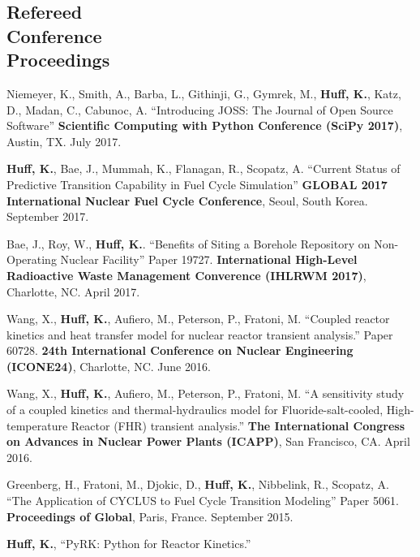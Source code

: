 \documentclass[margin,line]{resume}
\begin{document}
\begin{resume}
    \section{\mysidestyle Refereed\\Conference\\Proceedings}
    \begin{bibenum}
    \item Niemeyer, K., Smith, A., Barba, L., Githinji, G., Gymrek, M., 
            \textbf{Huff, K.}, Katz, D., Madan, C., Cabunoc, A. ``Introducing 
            JOSS: The Journal of Open Source Software'' \textbf{Scientific 
            Computing with Python Conference (SciPy 2017)}, Austin, TX. July 
            2017.
    \item \textbf{Huff, K.}, Bae, J., Mummah, K., Flanagan, R., Scopatz, A.
            ``Current Status of Predictive Transition Capability in Fuel Cycle 
            Simulation'' \textbf{GLOBAL 2017 International Nuclear Fuel Cycle 
            Conference}, Seoul, South Korea. September 2017.
      \item Bae, J., Roy, W., \textbf{Huff, K.}.
            ``Benefits of Siting a Borehole Repository on Non-Operating Nuclear 
            Facility'' Paper 19727.  \textbf{International High-Level Radioactive 
            Waste Management Converence (IHLRWM 2017)},
            Charlotte, NC. April 2017. 
      \item Wang, X., \textbf{Huff, K.}, Aufiero, M., Peterson, P., Fratoni, M.
            ``Coupled reactor kinetics and heat transfer model for nuclear 
            reactor transient analysis.'' Paper 60728.  \textbf{24th 
            International Conference on Nuclear Engineering (ICONE24)}, 
            Charlotte, NC.  June 2016. 
      \item Wang, X., \textbf{Huff, K.}, Aufiero, M., Peterson, P., Fratoni, M.
            ``A sensitivity study of a coupled kinetics and thermal-hydraulics 
            model for Fluoride-salt-cooled, High-temperature Reactor (FHR) 
            transient analysis.'' \textbf{The International 
            Congress on Advances in Nuclear Power Plants (ICAPP)}, San 
            Francisco, CA. April 2016.
      \item Greenberg, H., Fratoni, M., Djokic, D., \textbf{Huff, K.},
         Nibbelink, R., Scopatz, A. ``The Application of CYCLUS to Fuel Cycle
         Transition Modeling'' Paper 5061.
         \textbf{Proceedings of Global}, Paris, France. September 2015.
      \item \textbf{Huff, K.}, ``PyRK: Python for Reactor Kinetics.''

\end{bibenum}
\end{resume}
\end{document}
